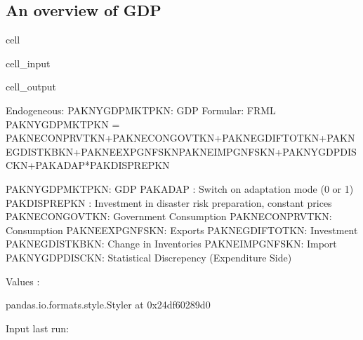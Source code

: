 \documentclass[letterpaper,10pt,english]{jupyterBook}
\begin{document}
\subsection{An overview of GDP}
\label{\detokenize{content/howto/experiments/create_experiment:an-overview-of-gdp}}
\begin{sphinxuseclass}{cell}\begin{sphinxVerbatimInput}

\begin{sphinxuseclass}{cell_input}
\begin{sphinxVerbatim}[commandchars=\\\{\}]
    
\end{sphinxVerbatim}

\end{sphinxuseclass}\end{sphinxVerbatimInput}
\begin{sphinxVerbatimOutput}

\begin{sphinxuseclass}{cell_output}
\begin{sphinxVerbatim}[commandchars=\\\{\}]
Endogeneous: PAKNYGDPMKTPKN: GDP
Formular: FRML  \PYGZlt{}\PYGZgt{} PAKNYGDPMKTPKN = PAKNECONPRVTKN+PAKNECONGOVTKN+PAKNEGDIFTOTKN+PAKNEGDISTKBKN+PAKNEEXPGNFSKN\PYGZhy{}PAKNEIMPGNFSKN+PAKNYGDPDISCKN+PAKADAP*PAKDISPREPKN \PYGZdl{}

PAKNYGDPMKTPKN: GDP
PAKADAP       : Switch on adaptation mode (0 or 1)
PAKDISPREPKN  : Investment in disaster risk preparation, constant prices
PAKNECONGOVTKN: Government Consumption
PAKNECONPRVTKN: Consumption
PAKNEEXPGNFSKN: Exports
PAKNEGDIFTOTKN: Investment
PAKNEGDISTKBKN: Change in Inventories
PAKNEIMPGNFSKN: Import
PAKNYGDPDISCKN: Statistical Discrepency (Expenditure Side)

Values :
\end{sphinxVerbatim}

\begin{sphinxVerbatim}[commandchars=\\\{\}]
\PYGZlt{}pandas.io.formats.style.Styler at 0x24df60289d0\PYGZgt{}
\end{sphinxVerbatim}

\begin{sphinxVerbatim}[commandchars=\\\{\}]
Input last run:
\end{sphinxVerbatim}


\end{sphinxuseclass}
\end{sphinxVerbatimOutput}
\end{sphinxuseclass}
\end{document}
